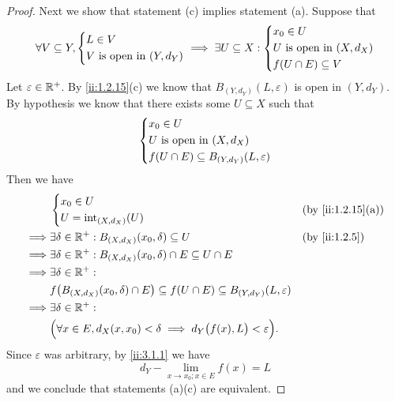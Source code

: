 \begin{proof}
  Next we show that statement (c) implies statement (a).
  Suppose that
  \[
    \forall V \subseteq Y, \begin{dcases}
      L \in V \\
      V \text{ is open in } (Y, d_Y)
    \end{dcases} \implies \exists U \subseteq X : \begin{dcases}
      x_0 \in U                      \\
      U \text{ is open in } (X, d_X) \\
      f(U \cap E) \subseteq V
    \end{dcases}
  \]
  Let \(\varepsilon \in \mathbb{R}^+\).
  By \cref{ii:1.2.15}(c) we know that \(B_{(Y, d_Y)}(L, \varepsilon)\) is open in \((Y, d_Y)\).
  By hypothesis we know that there exists some \(U \subseteq X\) such that
  \[
    \begin{dcases}
      x_0 \in U                      \\
      U \text{ is open in } (X, d_X) \\
      f(U \cap E) \subseteq B_{(Y, d_Y)}(L, \varepsilon)
    \end{dcases}
  \]
  Then we have
  \begin{align*}
             & \begin{dcases}
                 x_0 \in U \\
                 U = \text{int}_{(X, d_X)}(U)
               \end{dcases}                                                                             &  & \by{ii:1.2.15}[a]             \\
    \implies & \exists \delta \in \R^+ : B_{(X, d_X)}(x_0, \delta) \subseteq U                                          &  & \by{ii:1.2.5} \\
    \implies & \exists \delta \in \R^+ : B_{(X, d_X)}(x_0, \delta) \cap E \subseteq U \cap E                                               \\
    \implies & \exists \delta \in \R^+ :                                                                                                   \\
             & f\big(B_{(X, d_X)}(x_0, \delta) \cap E\big) \subseteq f(U \cap E) \subseteq B_{(Y, d_Y)}(L, \varepsilon)                    \\
    \implies & \exists \delta \in \R^+ :                                                                                                   \\
             & \Big(\forall x \in E, d_X(x, x_0) < \delta \implies d_Y\big(f(x), L\big) < \varepsilon\Big).
  \end{align*}
  Since \(\varepsilon\) was arbitrary, by \cref{ii:3.1.1} we have
  \[
    d_Y - \lim_{x \to x_0 ; x \in E} f(x) = L
  \]
  and we conclude that statements (a)(c) are equivalent.


\end{proof}
